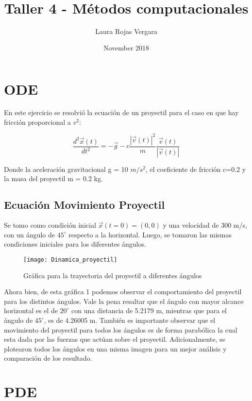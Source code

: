 \documentclass{article}
\title{Taller 4 - Métodos computacionales}
\author{Laura Rojas Vergara}
\date{November 2018}
\begin{document}
\maketitle

\section{ODE}

En este ejercicio se resolvió la ecuación de un proyectil para el caso en que hay fricción proporcional a $v^2$:

\begin{equation}
   \frac{d^2\vec{x}(t)}{dt^2} = -\vec{g}-c \frac{|\vec{v}(t)|^2}{m} \frac{\vec{v}(t)}{|\vec{v}(t)|}
\end{equation}


Donde la aceleración gravitacional g = 10 $m/s^2$, el coeficiente de fricción c=0.2 y la masa del proyectil m = 0.2 kg.

\subsection{Ecuación Movimiento Proyectil}

Se tomo como condición inicial $\vec{x}(t = 0) = (0,0)$ y una velocidad de 300 m/s, con un ángulo de $45^\circ$ respecto a la horizontal. Luego, se tomaron las mismas condiciones iniciales para los diferentes ángulos.

\begin{figure}[h!]
\centering
\texttt{[image: Dinamica\_proyectil]}
\caption{Gráfica para la trayectoria del proyectil a diferentes ángulos}
\label{proyectil}
\end{figure}


Ahora bien, de esta gráfica 1 podemos observar el comportamiento del proyectil para los distintos ángulos. Vale la pena resaltar que el ángulo con mayor alcance horizontal es el de $20^\circ$ con una distancia de 5.2179 m, mientras que para el ángulo de $45^\circ$, es de 4.26005 m. También es importante observar que el movimiento del proyectil para todos los ángulos es de forma parabólica la cual esta dada por las fuerzas que actúan sobre el proyectil. Adicionalmente, se plotearon todos los ángulos en una misma imagen para un mejor análisis y comparación de los resultado.


\section{PDE}
\end{document}
